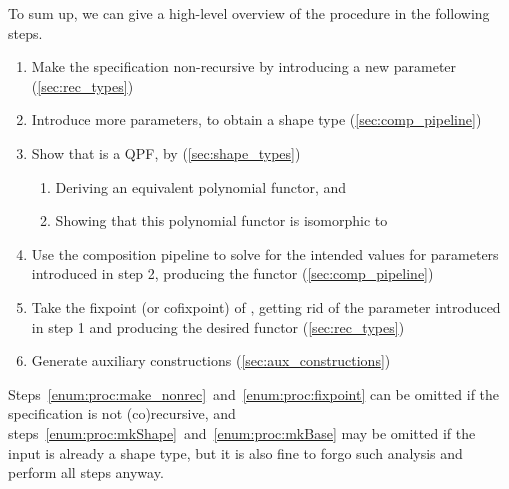 To sum up, we can give a high-level overview of the procedure in the following steps.
\begin{enumerate}
  \item\label{enum:proc:make_nonrec}
    Make the specification non-recursive by introducing a new parameter (\cref{sec:rec_types})
  \item\label{enum:proc:mkShape} 
    Introduce more parameters, to obtain a shape type  (\cref{sec:comp_pipeline})
  \item\label{enum:proc:mkQpf} 
    Show that  is a QPF, by (\cref{sec:shape_types})
        \begin{enumerate}
          \item Deriving an equivalent polynomial functor, and
          \item Showing that this polynomial functor is isomorphic to 
        \end{enumerate}
  \item\label{enum:proc:mkBase} 
    Use the composition pipeline to solve for the intended values for parameters introduced in step 2, producing the  functor (\cref{sec:comp_pipeline})
  \item\label{enum:proc:fixpoint} 
    Take the fixpoint (or cofixpoint) of , getting rid of the parameter introduced in step 1 
    and producing the desired functor (\cref{sec:rec_types})
  \item\label{enum:proc:aux} 
    Generate auxiliary constructions (\cref{sec:aux_constructions})
\end{enumerate}

Steps~\ref{enum:proc:make_nonrec}~and~\ref{enum:proc:fixpoint} can be omitted if the specification is not (co)recursive, and steps~\ref{enum:proc:mkShape}~and~\ref{enum:proc:mkBase} may be omitted
if the input is already a shape type, but it is also fine to forgo such analysis and perform all steps anyway.


